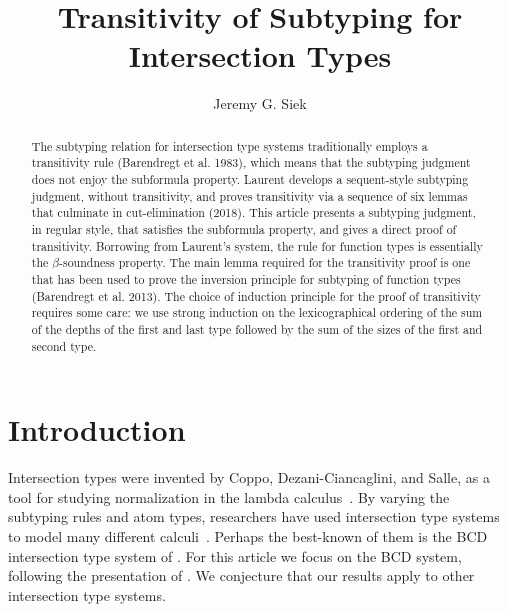 \documentclass{article}
\title{Transitivity of Subtyping for Intersection Types}
\author{Jeremy G. Siek}
\begin{document}
\maketitle

\newcommand{\TOP}{\ensuremath{\mathtt{U}}}
\newcommand{\dom}[1]{\mathrm{dom}(#1)}
\newcommand{\cod}[1]{\mathrm{cod}(#1)}
\newcommand{\topP}[1]{\mathrm{top}(#1)}
\newcommand{\topInCod}[1]{\mathrm{topInCod}(#1)}


\begin{abstract}
  The subtyping relation for intersection type systems traditionally
  employs a transitivity rule (Barendregt et al. 1983), which means
  that the subtyping judgment does not enjoy the subformula property.
  Laurent develops a sequent-style subtyping judgment, without
  transitivity, and proves transitivity via a sequence of six lemmas
  that culminate in cut-elimination (2018). This article presents a
  subtyping judgment, in regular style, that satisfies the subformula
  property, and gives a direct proof of transitivity. Borrowing from
  Laurent's system, the rule for function types is essentially the
  $\beta$-soundness property.  The main lemma required for the
  transitivity proof is one that has been used to prove the inversion
  principle for subtyping of function types (Barendregt et
  al. 2013). The choice of induction principle for the proof of
  transitivity requires some care: we use strong induction on the
  lexicographical ordering of the sum of the depths of the first and
  last type followed by the sum of the sizes of the first and second
  type.
\end{abstract}

\section{Introduction}

Intersection types were invented by Coppo, Dezani-Ciancaglini, and
Salle, as a tool for studying normalization in the lambda
calculus~\citep{Coppo:1979aa}. By varying the subtyping rules and atom
types, researchers have used intersection type systems to model many
different
calculi~\citep{Coppo:1980ab,Coppo:1981aa,Engeler:1981aa,Coppo:1984aa,Honsell:1992aa,Abramsky:1993fk,Plotkin:1993ab,Honsell:1999aa,Ishihara:2002aa,Rocca:2004aa,Dezani-Ciancaglini:2005aa,Alessi:2006aa}.
Perhaps the best-known of them is the BCD intersection type system of
\citet{Barendregt:1983aa}. For this article we focus on the BCD
system, following the presentation of \citet{Barendregt:2013aa}.  We
conjecture that our results apply to other intersection type systems.
\end{document}
